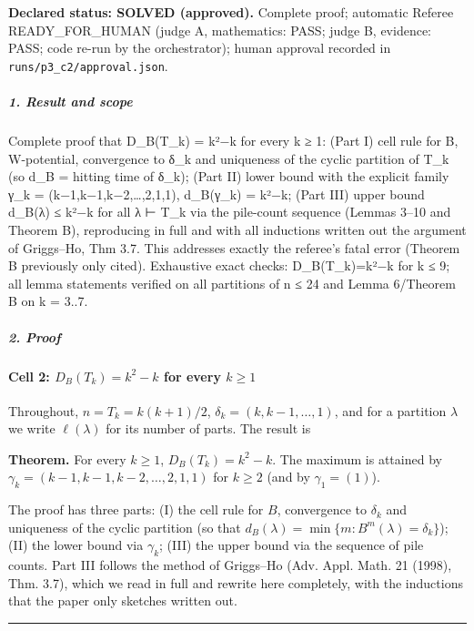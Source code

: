 \documentclass[11pt,a4paper]{article}
\begin{document}
\textbf{Declared status: SOLVED (approved).} Complete proof; automatic
Referee READY\_FOR\_HUMAN (judge A, mathematics: PASS; judge B,
evidence: PASS; code re-run by the orchestrator); human approval
recorded in \texttt{runs/p3\_c2/approval.json}.

\subparagraph{1. Result and scope}\label{result-and-scope}

Complete proof that D\_B(T\_k) = k²−k for every k ≥ 1: (Part I) cell
rule for B, W-potential, convergence to δ\_k and uniqueness of the
cyclic partition of T\_k (so d\_B = hitting time of δ\_k); (Part II)
lower bound with the explicit family γ\_k = (k−1,k−1,k−2,\ldots,2,1,1),
d\_B(γ\_k) = k²−k; (Part III) upper bound d\_B(λ) ≤ k²−k for all λ ⊢
T\_k via the pile-count sequence (Lemmas 3--10 and Theorem B),
reproducing in full and with all inductions written out the argument of
Griggs--Ho, Thm 3.7. This addresses exactly the referee's fatal error
(Theorem B previously only cited). Exhaustive exact checks:
D\_B(T\_k)=k²−k for k ≤ 9; all lemma statements verified on all
partitions of n ≤ 24 and Lemma 6/Theorem B on k = 3..7.

\subparagraph{2. Proof}\label{proof}

\paragraph{\texorpdfstring{Cell 2: \(D_B(T_k)=k^2-k\) for every
\(k\ge 1\)}{Cell 2: D\_B(T\_k)=k\^{}2-k for every k\textbackslash ge 1}}\label{cell-2-d_bt_kk2-k-for-every-kge-1}

Throughout, \(n=T_k=k(k+1)/2\), \(\delta_k=(k,k-1,\dots,1)\), and for a
partition \(\lambda\) we write \(\ell(\lambda)\) for its number of
parts. The result is

\textbf{Theorem.} For every \(k\ge1\), \(D_B(T_k)=k^2-k\). The maximum
is attained by \(\gamma_k=(k-1,k-1,k-2,\dots,2,1,1)\) for \(k\ge2\) (and
by \(\gamma_1=(1)\)).

The proof has three parts: (I) the cell rule for \(B\), convergence to
\(\delta_k\) and uniqueness of the cyclic partition (so that
\(d_B(\lambda)=\min\{m: B^m(\lambda)=\delta_k\}\)); (II) the lower bound
via \(\gamma_k\); (III) the upper bound via the sequence of pile counts.
Part III follows the method of Griggs--Ho (Adv. Appl. Math. 21 (1998),
Thm. 3.7), which we read in full and rewrite here completely, with the
inductions that the paper only sketches written out.

\begin{center}\rule{0.5\linewidth}{0.5pt}\end{center}
\end{document}
